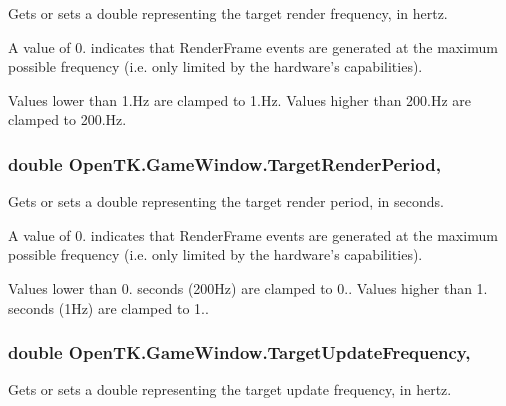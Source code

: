 Gets or sets a double representing the target render frequency, in hertz. 

A value of 0. indicates that Render\-Frame events are generated at the maximum possible frequency (i.\-e. only limited by the hardware's capabilities).

Values lower than 1.\-Hz are clamped to 1.\-Hz. Values higher than 200.\-Hz are clamped to 200.\-Hz.\hypertarget{class_open_t_k_1_1_game_window_a2233cfb62a42200251dcdb1dab643a36}{
\subsubsection[{Target\-Render\-Period}]{\setlength{\rightskip}{0pt plus 5cm}double Open\-T\-K.\-Game\-Window.\-Target\-Render\-Period\hspace{0.3cm}{\ttfamily [get]}, {\ttfamily [set]}}}\label{class_open_t_k_1_1_game_window_a2233cfb62a42200251dcdb1dab643a36}


Gets or sets a double representing the target render period, in seconds. 

A value of 0. indicates that Render\-Frame events are generated at the maximum possible frequency (i.\-e. only limited by the hardware's capabilities).

Values lower than 0. seconds (200\-Hz) are clamped to 0.. Values higher than 1. seconds (1\-Hz) are clamped to 1..\hypertarget{class_open_t_k_1_1_game_window_acf250353ae71ed429642335d614da7c5}{
\subsubsection[{Target\-Update\-Frequency}]{\setlength{\rightskip}{0pt plus 5cm}double Open\-T\-K.\-Game\-Window.\-Target\-Update\-Frequency\hspace{0.3cm}{\ttfamily [get]}, {\ttfamily [set]}}}\label{class_open_t_k_1_1_game_window_acf250353ae71ed429642335d614da7c5}


Gets or sets a double representing the target update frequency, in hertz. 

